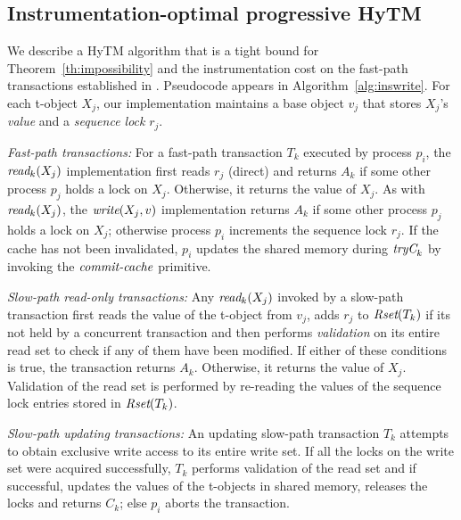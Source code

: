 \subsection{Instrumentation-optimal progressive HyTM}
We describe a HyTM algorithm that is a tight bound for Theorem~\ref{th:impossibility} and the instrumentation 
cost on the fast-path transactions established in \cite{hytm14disc}.
Pseudocode appears in Algorithm~\ref{alg:inswrite}.
For each t-object $X_j$, our implementation maintains a base object $v_j$ that stores $X_j$'s \emph{value}
and a \emph{sequence lock} $r_{j}$. 

\vspace{1mm}\noindent\textit{Fast-path transactions:}
For a fast-path transaction $T_k$ executed by process $p_i$, the $\textit{read}_k(X_j)$ implementation first reads $r_j$ (direct)
and returns $A_k$ if some other process $p_j$ holds a lock on $X_j$.
Otherwise, it returns the value of $X_j$.
As with $\textit{read}_k(X_j)$, the $\textit{write} (X_j,v)$ implementation returns $A_k$ if some other process $p_j$ holds a lock on $X_j$; otherwise
process $p_i$ increments the sequence lock $r_j$. If the cache has not been invalidated, $p_i$ updates the shared memory
during $\textit{tryC}_k$ by invoking the $\ms{commit-cache}$ primitive.

\vspace{1mm}\noindent\textit{Slow-path read-only transactions:}
Any $\textit{read}_k(X_j)$ invoked by a slow-path transaction first reads the value of the t-object from $v_j$, 
adds $r_j$ to $\textit{Rset}(T_k)$ if its not held by a concurrent transaction
and then performs \emph{validation} on its entire read set to check if any of them have been modified. 
If either of these conditions is true,
the transaction returns $A_k$. Otherwise, it returns the value of $X_j$. 
Validation of the read set is performed by re-reading the values of the sequence lock entries stored in $\textit{Rset}(T_k)$.

\vspace{1mm}\noindent\textit{Slow-path updating transactions:}
An updating slow-path transaction $T_k$ attempts to obtain exclusive write access to its 
entire write set.
If all the locks on the write set were acquired successfully, $T_k$ performs validation of the read set and if successful, updates the values of
the t-objects in shared memory, releases the locks and returns $C_k$; else $p_i$ aborts the transaction.

